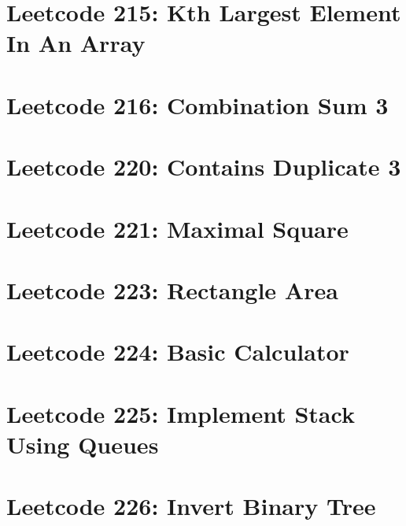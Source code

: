 \documentclass{article}
\begin{document}
\section*{Leetcode 215: Kth Largest Element In An Array}

\pagebreak 

\section*{Leetcode 216: Combination Sum 3}

\pagebreak 

\section*{Leetcode 220: Contains Duplicate 3}

\pagebreak 

\section*{Leetcode 221: Maximal Square}

\pagebreak 

\section*{Leetcode 223: Rectangle Area}

\pagebreak 

\section*{Leetcode 224: Basic Calculator}

\pagebreak 

\section*{Leetcode 225: Implement Stack Using Queues}

\pagebreak 

\section*{Leetcode 226: Invert Binary Tree}

\pagebreak 
\end{document}

